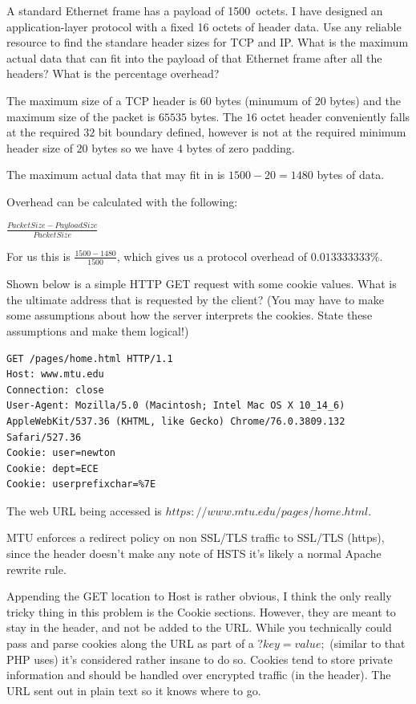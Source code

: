 \documentclass[12pt,addpoints,answers]{exam}
\begin{document}
\begin{questions}
\question[8] A standard Ethernet frame has a payload of \SI{1500}{octets}. I have designed an application-layer protocol with a fixed 16 octets of header data. Use any reliable resource to find the standare header sizes for TCP and IP. What is the maximum actual data that can fit into the payload of that Ethernet frame after all the headers? What is the percentage overhead?
\begin{solution}
	The maximum size of a TCP header is $60$ bytes (minumum of $20$ bytes) and the maximum size of the packet is $65535$ bytes.  The $16$ octet header conveniently falls at the required $32$ bit boundary defined, however is not at the required minimum header size of $20$ bytes so we have $4$ bytes of zero padding.
	
	The maximum actual data that may fit in is $1500 - 20 = 1480$ bytes of data.
	
	Overhead can be calculated with the following:
	\begin{center}
		$\frac{Packet Size - Payload Size}{Packet Size}$
	\end{center}
	For us this is $\frac{1500 - 1480}{1500}$, which gives us a protocol overhead of $0.013333333 \%$.
\end{solution}

\question[8] Shown below is a simple HTTP GET request with some cookie values. What is the ultimate address that is requested by the client? (You may have to make some assumptions about how the server interprets the cookies. State these assumptions and make them logical!)\\
\begin{minipage}{\textwidth}
\begin{lstlisting}[language={},escapechar=§,basicstyle=\ttfamily,breaklines=true]
GET /pages/home.html HTTP/1.1
Host: www.mtu.edu
Connection: close
User-Agent: Mozilla/5.0 (Macintosh; Intel Mac OS X 10_14_6) AppleWebKit/537.36 (KHTML, like Gecko) Chrome/76.0.3809.132 Safari/527.36
Cookie: user=newton
Cookie: dept=ECE
Cookie: userprefixchar=%7E
\end{lstlisting}
\end{minipage}
\begin{solution}
	The web URL being accessed is $https://www.mtu.edu/pages/home.html$.
	
	MTU enforces a redirect policy on non SSL/TLS traffic to SSL/TLS (https), since the header doesn't make any note of HSTS it's likely a normal Apache rewrite rule.  
	
	Appending the GET location to Host is rather obvious, I think the only really tricky thing in this problem is the Cookie sections.  However, they are meant to stay in the header, and not be added to the URL.  While you technically could pass and parse cookies along the URL as part of a $?key=value;$ (similar to that PHP uses) it's considered rather insane to do so.  Cookies tend to store private information and should be handled over encrypted traffic (in the header).  The URL sent out in plain text so it knows where to go.
\end{solution}


\end{questions}
\end{document}

